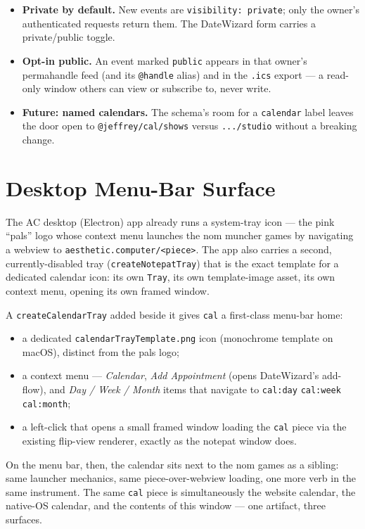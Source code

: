 \documentclass[10pt,letterpaper,twocolumn]{article}
\begin{document}
\begin{itemize}
  \item \textbf{Private by default.} New events are \texttt{visibility:\,private}; only the owner's authenticated requests return them. The DateWizard form carries a private/public toggle.
  \item \textbf{Opt-in public.} An event marked \texttt{public} appears in that owner's permahandle feed (and its \texttt{@handle} alias) and in the \texttt{.ics} export --- a read-only window others can view or subscribe to, never write.
  \item \textbf{Future: named calendars.} The schema's room for a \texttt{calendar} label leaves the door open to \texttt{@jeffrey/cal/shows} versus \texttt{.../studio} without a breaking change.
\end{itemize}

\section{Desktop Menu-Bar Surface}

The AC desktop (Electron) app already runs a system-tray icon --- the pink ``pals'' logo whose context menu launches the nom muncher games by navigating a webview to \texttt{aesthetic.computer/<piece>}. The app also carries a second, currently-disabled tray (\texttt{createNotepatTray}) that is the exact template for a dedicated calendar icon: its own \texttt{Tray}, its own template-image asset, its own context menu, opening its own framed window.

A \texttt{createCalendarTray} added beside it gives \texttt{cal} a first-class menu-bar home:

\begin{itemize}
  \item a dedicated \texttt{calendarTrayTemplate.png} icon (monochrome template on macOS), distinct from the pals logo;
  \item a context menu --- \emph{Calendar}, \emph{Add Appointment} (opens DateWizard's add-flow), and \emph{Day / Week / Month} items that navigate to \texttt{cal:day} \textbar{} \texttt{cal:week} \textbar{} \texttt{cal:month};
  \item a left-click that opens a small framed window loading the \texttt{cal} piece via the existing flip-view renderer, exactly as the notepat window does.
\end{itemize}

On the menu bar, then, the calendar sits next to the nom games as a sibling: same launcher mechanics, same piece-over-webview loading, one more verb in the same instrument. The same \texttt{cal} piece is simultaneously the website calendar, the native-OS calendar, and the contents of this window --- one artifact, three surfaces.
\end{document}
